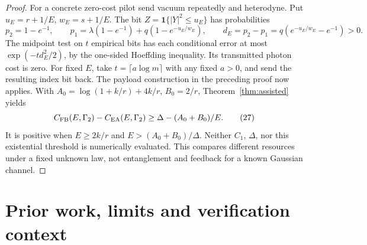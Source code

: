 \documentclass[11pt]{article}
\begin{document}
\begin{proof}
For a concrete zero-cost pilot send vacuum repeatedly and heterodyne.
Put \(u_E=r+1/E\), \(w_E=s+1/E\). The bit
\(Z=\mathbf1\{|Y|^2\leq u_E\}\) has probabilities
\[
 p_2=1-e^{-1},\qquad
 p_1=\lambda(1-e^{-1})+q(1-e^{-u_E/w_E}),\qquad
 d_E=p_2-p_1=q(e^{-u_E/w_E}-e^{-1})>0.
\]
The midpoint test on \(t\) empirical bits has each conditional error
at most \(\exp(-t d_E^2/2)\), by the one-sided Hoeffding inequality.
Its transmitted photon cost is zero. For fixed \(E\), take
\(t=\lceil a\log m\rceil\) with any fixed \(a>0\), and send the
resulting index bit back. The payload construction in the preceding
proof now applies. With \(A_0=\log(1+k/r)+4k/r\), \(B_0=2/r\),
Theorem~\ref{thm:assisted} yields
\[
 C_{\rm FB}(E,\Gamma_2)-C_{\rm EA}(E,\Gamma_2)
       \geq\Delta-(A_0+B_0)/E.                         \tag{27}
\]
It is positive when \(E\geq2k/r\) and \(E>(A_0+B_0)/\Delta\).
Neither \(C_1\), \(\Delta\), nor this existential threshold is
numerically evaluated. This compares different resources under a fixed
unknown law, not entanglement and feedback for a known Gaussian channel.
\end{proof}


\section{Prior work, limits and verification context}
\end{document}
